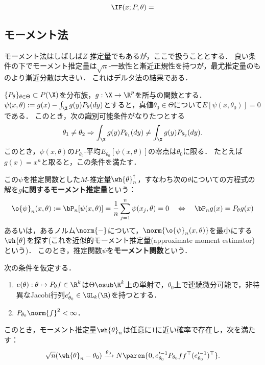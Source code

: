\documentclass[uplatex,dvipdfmx]{jsreport}
\begin{document}
\begin{theorem}
    \[\IF(x;P,\theta)=\]
\end{theorem}

\subsection{モーメント法}

\begin{tcolorbox}[colframe=ForestGreen, colback=ForestGreen!10!white,breakable,colbacktitle=ForestGreen!40!white,coltitle=black,fonttitle=\bfseries\sffamily,
title=]
    モーメント法はしばしば$Z$-推定量でもあるが，ここで扱うこととする．
    良い条件の下でモーメント推定量は$\sqrt{n}$-一致性と漸近正規性を持つが，最尤推定量のものより漸近分散は大きい．
    これはデルタ法の結果である．
\end{tcolorbox}

\begin{notation}
    $\{P_\theta\}_{\theta\in\Theta}\subset P(\X)$を分布族，$g:\X\to\R^p$を所与の関数とする．
    $\psi(x,\theta):=g(x)-\int_\X g(y)P_\theta(dy)$とすると，真値$\theta_0\in\Theta$について$E[\psi(x,\theta_0)]=0$である．
    このとき，次の識別可能条件がなりたつとする
    \[\theta_1\ne\theta_2\Rightarrow\int_\X g(y)P_{\theta_1}(dy)\ne\int_\X g(y)P_{\theta_2}(dy).\]
    このとき，$\psi(x,\theta)$の$P_{\theta_0}$-平均$E_{\theta_0}[\psi(x,\theta)]$の零点は$\theta_0$に限る．
    たとえば$g(x)=x^n$と取ると，この条件を満たす．
\end{notation}

\begin{definition}
    この$\psi$を推定関数とした$M$-推定量$\wh{\theta}^\dagger_n$，すなわち次の$\theta$についての方程式の解を\textbf{$g$に関するモーメント推定量}という：
    \[\o{\psi}_n(x,\theta):=\bP_n[\psi(x,\theta)]=\frac{1}{n}\sum_{j=1}^n\psi(x_j,\theta)=0\quad\Leftrightarrow\quad \bP_ng(x)=P_\theta g(x)\]
    あるいは，あるノルム$\norm{-}$について，$\norm{\o{\psi}_n(x,\theta)}$を最小にする$\wh{\theta}$を探す(これを近似的モーメント推定量(approximate moment estimator)という)．
    このとき，推定関数$\psi$を\textbf{モーメント関数}という．
\end{definition}

\begin{theorem}
    次の条件を仮定する．
    \begin{enumerate}[({M}1)]
        \item $e(\theta):\theta\mapsto P_\theta f\in\R^k$は$\Theta\osub\R^k$上の単射で，$\theta_0$上で連続微分可能で，非特異なJacobi行列$e'_{\theta_0}\in\GL_k(\R)$を持つとする．
        \item $P_{\theta_0}\norm{f}^2<\infty$．
    \end{enumerate}
    このとき，モーメント推定量$\wh{\theta}_n$は任意に$1$に近い確率で存在し，次を満たす：
    \[\sqrt{n}(\wh{\theta}_n-\theta_0)\xrightarrow{\theta_0}N\paren{0,e'^{-1}_{\theta_0}P_{\theta_0}ff^\top(e'^{-1}_{\theta_0})^\top}.\]
\end{theorem}
\end{document}
